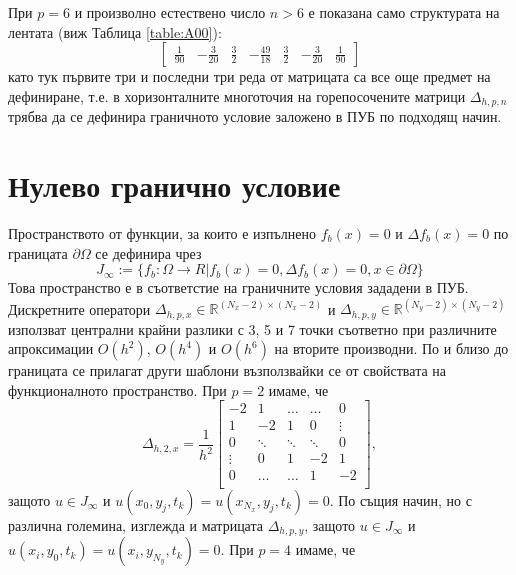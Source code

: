 \documentclass{article}
\newcommand{\be}{\begin{equation}}
\newcommand{\ee}{\end{equation}}
\newcommand{\RR}{\mathbb{R}}
\begin{document}
При $p=6$ и произволно естествено число $n>6$ е показана само структурата на лентата  (виж Таблица \ref{table:A00}):
\[
\begin{bmatrix}
    \frac{1}{90}	& -\frac{3}{20}	& \frac{3}{2}         	& -\frac{49}{18}	&  \frac{3}{2}    	 &   -\frac{3}{20}	  &      \frac{1}{90}
\end{bmatrix}
\]
като тук първите три и последни три реда от матрицата са все още предмет на дефиниране, т.е. в хоризонталните многоточия на горепосочените матрици $\Delta_{h,p,n}$ трябва да се дефинира граничното условие заложено в ПУБ по подходящ начин.

\section{Нулево гранично условие}
Пространството от функции, за които е изпълнено $f_b(x) = 0$ и $\Delta f_b(x) = 0$ по границата $\partial\Omega$ се дефинира чрез
\be\label{funSpace}
J_\infty:=\{ f_b : \Omega \rightarrow R | f_b(x) = 0, \Delta f_b(x) = 0, x \in \partial\Omega\}
\ee
Това пространство е в съответстие на граничните условия зададени в ПУБ. Дискретните оператори $\Delta_{h,p,x} \in \RR^{(N_x-2) \times (N_x-2)}$ и $\Delta_{h,p,y} \in \RR^{(N_y-2)\times(N_y-2)}$  използват централни крайни разлики с 3, 5 и 7 точки съответно при различните апроксимации $O(h^2)$, $O(h^4)$ и $O(h^6)$ на вторите производни. По и близо до границата се прилагат други шаблони възползвайки се от свойствата на функционалното пространство. При $p=2$ имаме, че 
\[
\Delta_{h,2,x} = \frac{1}{h^2}
\begin{bmatrix}
    -2	       & 1        &     \dots   &   \dots        & 0   \\
    1               & -2            &   1           &   0               & \vdots    \\
        0           & \ddots        &    \ddots    &   \ddots       &  0 \\ 
    \vdots       &     0            &  1     	& -2    	   & 1 \\
    0               & \dots          &  \dots         & 1  	   & -2 \\
\end{bmatrix},
\]
защото $u \in J_\infty$ и $u(x_0, y_j, t_k) = u(x_{N_x}, y_j, t_k) = 0$. По същия начин, но с различна големина, изглежда и матрицата $\Delta_{h,p,y}$, защото $u \in J_\infty$ и $u(x_i, y_0, t_k) = u(x_i, y_{N_y}, t_k) = 0$.  При $p=4$ имаме, че 
\end{document}
